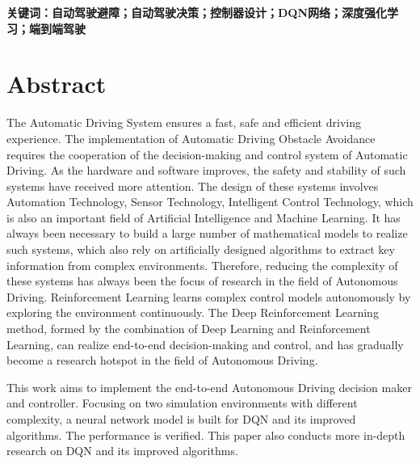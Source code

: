 \vspace{4ex}\noindent\textbf{\heiti 关键词：自动驾驶避障；自动驾驶决策；控制器设计；DQN网络；深度强化学习；端到端驾驶}
\newpage

\vspace*{-2mm}

\begin{spacing}{0.95}
  \centering
  \heiti{}\textbf{\thesisTitleEN}
\end{spacing}

\vspace*{17mm}

{\let\clearpage\relax \chapter*{
  \textmd{Abstract}\vskip -3bp}}
\setcounter{page}{2}

\setlength{\parskip}{0em}

The Automatic Driving System ensures a fast, safe and efficient driving experience. The implementation of Automatic Driving Obstacle Avoidance requires the cooperation of the decision-making and control system of Automatic Driving. As the hardware and software improves, the safety and stability of such systems have received more attention. The design of these systems involves Automation Technology, Sensor Technology, Intelligent Control Technology, which is also an important field of Artificial Intelligence and Machine Learning. It has always been necessary to build a large number of mathematical models to realize such systems, which also rely on artificially designed algorithms to extract key information from complex environments. Therefore, reducing the complexity of these systems has always been the focus of research in the field of Autonomous Driving. Reinforcement Learning learns complex control models autonomously by exploring the environment continuously. The Deep Reinforcement Learning method, formed by the combination of Deep Learning and Reinforcement Learning,  can realize end-to-end decision-making and control, and has gradually become a research hotspot in the field of Autonomous Driving.

This work aims to implement the end-to-end Autonomous Driving decision maker and controller. Focusing on two simulation environments with different complexity, a neural network model is built for DQN and its improved algorithms. The performance is verified. This paper also conducts more in-depth research on DQN and its improved algorithms. 

